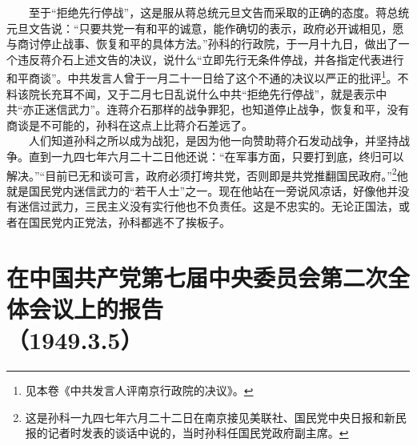 \documentclass[cn,11pt,chinese]{elegantbook}
\def\myformat#1{\hfil\hfil #1}
\begin{document}
　　至于“拒绝先行停战”，这是服从蒋总统元旦文告而采取的正确的态度。蒋总统元旦文告说：“只要共党一有和平的诚意，能作确切的表示，政府必开诚相见，愿与商讨停止战事、恢复和平的具体方法。”孙科的行政院，于一月十九日，做出了一个违反蒋介石上述文告的决议，说什么“立即先行无条件停战，并各指定代表进行和平商谈”。中共发言人曾于一月二十一日给了这个不通的决议以严正的批评\footnote[4]{ 见本卷《中共发言人评南京行政院的决议》。}。不料该院长充耳不闻，又于二月七日乱说什么中共“拒绝先行停战”，就是表示中共“亦正迷信武力”。连蒋介石那样的战争罪犯，也知道停止战争，恢复和平，没有商谈是不可能的，孙科在这点上比蒋介石差远了。\\
　　人们知道孙科之所以成为战犯，是因为他一向赞助蒋介石发动战争，并坚持战争。直到一九四七年六月二十二日他还说：“在军事方面，只要打到底，终归可以解决。”“目前已无和谈可言，政府必须打垮共党，否则即是共党推翻国民政府。”\footnote[5]{ 这是孙科一九四七年六月二十二日在南京接见美联社、国民党中央日报和新民报的记者时发表的谈话中说的，当时孙科任国民党政府副主席。}他就是国民党内迷信武力的“若干人士”之一。现在他站在一旁说风凉话，好像他并没有迷信过武力，三民主义没有实行他也不负责任。这是不忠实的。无论正国法，或者在国民党内正党法，孙科都逃不了挨板子。\\
\newpage\section*{\myformat{在中国共产党第七届中央委员会第二次全体会议上的报告}\\\myformat{（1949.3.5）}}
\end{document}
